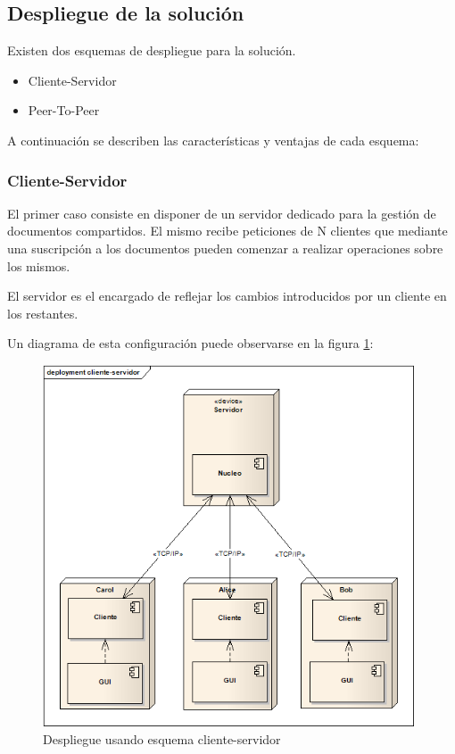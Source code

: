 \documentclass[12pt,a4paper]{article}
\begin{document}
\subsection{Despliegue de la solución}
Existen dos esquemas de despliegue para la solución.

\begin{itemize}
\item Cliente-Servidor
\item Peer-To-Peer
\end{itemize}

A continuación se describen las características y ventajas de cada esquema:

\subsubsection{Cliente-Servidor}
El primer caso consiste en disponer de un servidor dedicado para la gestión de documentos compartidos. El mismo recibe
peticiones de N clientes que mediante una suscripción a los documentos pueden comenzar a realizar operaciones sobre los mismos.

El servidor es el encargado de reflejar los cambios introducidos por un cliente en los restantes.

Un diagrama de esta configuración puede observarse en la figura \ref{cliente-servidor}:

	\begin{figure}[!ht]
		\begin{center}
			\includegraphics[width=11cm]{cliente-servidor.png}
			\caption{\label{cliente-servidor} Despliegue usando esquema cliente-servidor }
		\end{center}
	\end{figure}
\end{document}
